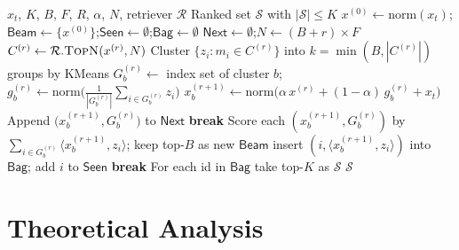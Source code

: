 \begin{algorithm}[h]
\caption{Recollection Retrieval: retrieve $\rightarrow$ cluster $\rightarrow$ $\alpha$-mix $\rightarrow$ iterate}
\label{alg:rfmem-recol}
\begin{algorithmic}[1]
\Require $x_t$, $K$, $B$, $F$, $R$, $\alpha$, $N$, retriever $\mathcal{R}$
\Ensure Ranked set $\mathcal{S}$ with $|\mathcal{S}|\le K$
\State $x^{(0)} \gets \mathrm{norm}(x_t)$;\quad $\mathsf{Beam} \gets \{x^{(0)}\}$;\quad $\mathsf{Seen}\gets\emptyset$;\quad $\mathsf{Bag}\gets\emptyset$
  \State $\mathsf{Next}\gets\emptyset$;\quad $N \gets (B+r)\times F$ 
    \State $C^{(r)} \gets \mathcal{R}.\textsc{TopN}(x^{(r)}, N)$ 
    \State Cluster $\{z_i: m_i\in C^{(r)}\}$ into $k=\min(B,|C^{(r)}|)$ groups by KMeans
       \State $G^{(r)}_b \gets$ index set of cluster $b$;\quad $g^{(r)}_b \gets \mathrm{norm}\big(\frac{1}{|G^{(r)}_b|}\sum_{i\in G^{(r)}_b} z_i\big)$
       \State $x^{(r+1)}_b \gets \mathrm{norm}\big(\alpha\,x^{(r)} + (1-\alpha)\,g^{(r)}_b + x_t\big)$
       \State Append $\big(x^{(r+1)}_b, G^{(r)}_b\big)$ to $\mathsf{Next}$
    \EndFor
  \EndFor
   \textbf{break} \EndIf
  \State Score each $(x^{(r+1)}_b, G^{(r)}_b)$ by $\sum_{i\in G^{(r)}_b}\langle x^{(r+1)}_b, z_i\rangle$; keep top-$B$ as new $\mathsf{Beam}$
       insert $(i,\langle x^{(r+1)}_b, z_i\rangle)$ into $\mathsf{Bag}$; add $i$ to $\mathsf{Seen}$ \EndIf
    \EndFor
  \EndFor
   \textbf{break} \EndIf
\EndFor
\State For each id in $\mathsf{Bag}$ take top-$K$ as $\mathcal{S}$
\State \Return $\mathcal{S}$
\end{algorithmic}
\end{algorithm}



\FloatBarrier
\section{Theoretical Analysis}
\label{app:theory}

\newtheorem{theorem}{Theorem}
\newtheorem{proposition}{Proposition}
\newtheorem{lemma}{Lemma}
\newtheorem{corollary}{Corollary}

